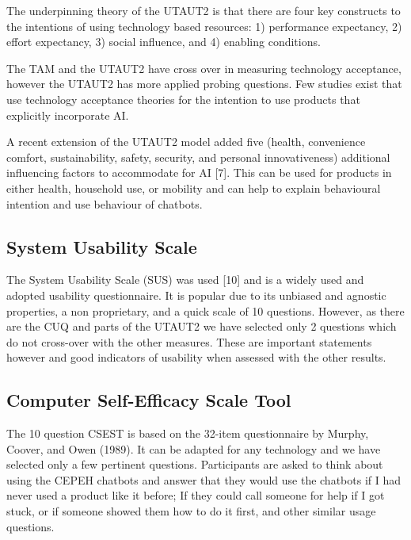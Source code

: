\documentclass[a4paper, nobind]{templates/ociamthesis}
\begin{document}
The underpinning theory of the UTAUT2 is that there are four key constructs to the intentions of using technology based resources: 1) performance expectancy, 2) effort expectancy, 3) social influence, and 4) enabling conditions.

The TAM and the UTAUT2 have cross over in measuring technology acceptance, however the UTAUT2 has more applied probing questions. Few studies exist that use technology acceptance theories for the intention to use products that explicitly incorporate AI.

A recent extension of the UTAUT2 model added five (health, convenience comfort, sustainability, safety, security, and personal innovativeness) additional influencing factors to accommodate for AI {[}7{]}.
This can be used for products in either health, household use, or mobility and can help to explain behavioural intention and use behaviour of chatbots.

\hypertarget{system-usability-scale}{%
\subsection{System Usability Scale}\label{system-usability-scale}}

The System Usability Scale (SUS) was used {[}10{]} and is a widely used and adopted usability questionnaire.
It is popular due to its unbiased and agnostic properties, a non proprietary, and a quick scale of 10 questions. However, as there are the CUQ and parts of the UTAUT2 we have selected only 2 questions which do not cross-over with the other measures. These are important statements however and good indicators of usability when assessed with the other results.

\hypertarget{computer-self-efficacy-scale-tool}{%
\subsection{Computer Self-Efficacy Scale Tool}\label{computer-self-efficacy-scale-tool}}

The 10 question CSEST is based on the 32-item questionnaire by Murphy, Coover, and Owen (1989). It can be adapted for any technology and we have selected only a few pertinent questions. Participants are asked to think about using the CEPEH chatbots and answer that they would use the chatbots if I had never used a product like it before; If they could call someone for help if I got stuck, or if someone showed them how to do it first, and other similar usage questions.
\end{document}

